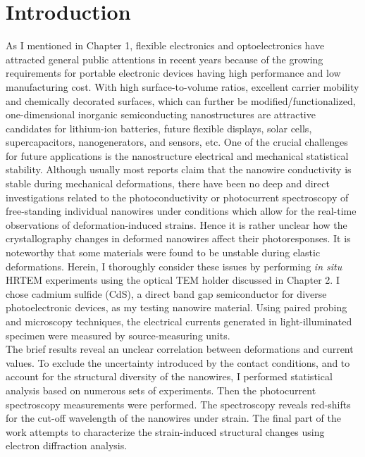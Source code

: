 \section{Introduction}
As I mentioned in Chapter 1, flexible electronics and optoelectronics have attracted general public attentions in recent years because of the growing requirements for portable electronic devices having high performance and low manufacturing cost.\cite{Boland2010,Liu2015,Long2012} 
With high surface-to-volume ratios, excellent carrier mobility and chemically decorated surfaces, which can further be modified/functionalized, one-dimensional inorganic semiconducting nanostructures are attractive candidates for lithium-ion batteries,\cite{Wang2015} future flexible displays,\cite{Klauk2008} solar cells,\cite{Zhang2012} supercapacitors,\cite{Li2014} nanogenerators,\cite{Fan2012} and sensors,\cite{Zhang2014c} etc. 
One of the crucial challenges for future applications is the nanostructure electrical and mechanical statistical stability. 
Although usually most reports claim that the nanowire conductivity is stable during mechanical deformations, there have been no deep and direct investigations related to the photoconductivity or photocurrent spectroscopy of free-standing individual nanowires under conditions which allow for the real-time observations of deformation-induced strains. 
Hence it is rather unclear how the crystallography changes in deformed nanowires affect their photoresponses. 
It is noteworthy that some materials were found to be unstable during elastic deformations.\cite{Antsov2014}
Herein, I thoroughly consider these issues by performing {\em in situ} HRTEM experiments using the optical TEM holder discussed in Chapter 2. 
I chose cadmium sulfide (CdS), a direct band gap semiconductor for diverse photoelectronic devices, as my testing nanowire material.\cite{Xing2015} 
Using paired probing and microscopy techniques, the electrical currents generated in light-illuminated specimen were measured by source-measuring units. \\
The brief results reveal an unclear correlation between deformations and current values. 
To exclude the uncertainty introduced by the contact conditions, and to account for the structural diversity of the nanowires, I performed statistical analysis based on numerous sets of experiments. 
Then the photocurrent spectroscopy measurements were performed. The spectroscopy reveals red-shifts for the cut-off wavelength of the nanowires under strain. 
The final part of the work attempts to characterize the strain-induced structural changes using electron diffraction analysis. 


